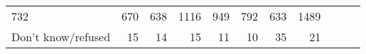 \documentclass[]{article}
\begin{document}
\begin{longtable}[]{@{}lrrrrrrrrrr@{}}
\begin{minipage}[t]{0.05\columnwidth}
732\strut
\end{minipage} & \begin{minipage}[t]{0.05\columnwidth}\raggedleft\strut
670\strut
\end{minipage} & \begin{minipage}[t]{0.05\columnwidth}\raggedleft\strut
638\strut
\end{minipage} & \begin{minipage}[t]{0.05\columnwidth}\raggedleft\strut
1116\strut
\end{minipage} & \begin{minipage}[t]{0.06\columnwidth}\raggedleft\strut
949\strut
\end{minipage} & \begin{minipage}[t]{0.06\columnwidth}\raggedleft\strut
792\strut
\end{minipage} & \begin{minipage}[t]{0.04\columnwidth}\raggedleft\strut
633\strut
\end{minipage} & \begin{minipage}[t]{0.11\columnwidth}\raggedleft\strut
1489\strut
\end{minipage}\tabularnewline
\begin{minipage}[t]{0.14\columnwidth}\raggedright\strut
Don't know/refused\strut
\end{minipage} & \begin{minipage}[t]{0.04\columnwidth}\raggedleft\strut
15\strut
\end{minipage} & \begin{minipage}[t]{0.05\columnwidth}\raggedleft\strut
14\strut
\end{minipage} & \begin{minipage}[t]{0.05\columnwidth}\raggedleft\strut
15\strut
\end{minipage} & \begin{minipage}[t]{0.05\columnwidth}\raggedleft\strut
11\strut
\end{minipage} & \begin{minipage}[t]{0.05\columnwidth}\raggedleft\strut
10\strut
\end{minipage} & \begin{minipage}[t]{0.05\columnwidth}\raggedleft\strut
35\strut
\end{minipage} & \begin{minipage}[t]{0.06\columnwidth}\raggedleft\strut
21\strut
\end{minipage} & \begin{minipage}[t]{0.06\columnwidth}\raggedleft\strut

\end{minipage}
\end{longtable}
\end{document}
